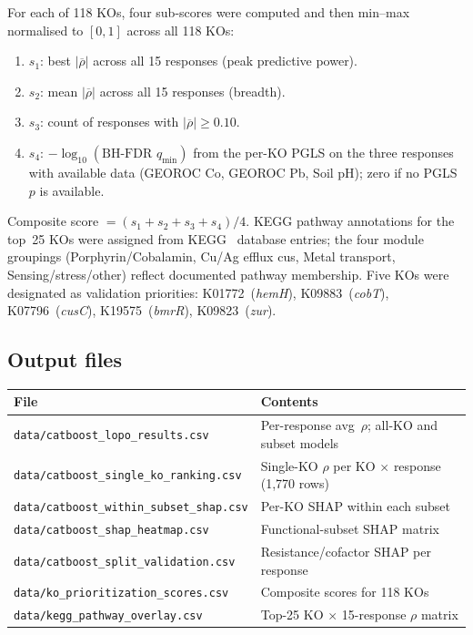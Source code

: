 \documentclass[11pt]{article}
\begin{document}
For each of 118 KOs, four sub-scores were computed and then min--max
normalised to $[0,1]$ across all 118 KOs:
\begin{enumerate}
  \item $s_1$: best $|\overline{\rho}|$ across all 15 responses
        (peak predictive power).
  \item $s_2$: mean $|\overline{\rho}|$ across all 15 responses (breadth).
  \item $s_3$: count of responses with $|\overline{\rho}| \geq 0.10$.
  \item $s_4$: $-\log_{10}(\text{BH-FDR }q_\text{min})$ from the per-KO PGLS
        on the three responses with available data (GEOROC Co, GEOROC Pb,
        Soil pH); zero if no PGLS $p$ is available.
\end{enumerate}
Composite score $= (s_1 + s_2 + s_3 + s_4)/4$.
KEGG pathway annotations for the top~25 KOs were assigned from KEGG~\cite{kanehisa2023} database
entries; the four module groupings (Porphyrin/Cobalamin, Cu/Ag efflux cus,
Metal transport, Sensing/stress/other) reflect documented pathway membership.
Five KOs were designated as validation priorities:
K01772~(\textit{hemH}), K09883~(\textit{cobT}), K07796~(\textit{cusC}),
K19575~(\textit{bmrR}), K09823~(\textit{zur}).

\subsection{Output files}

\begin{center}
\begin{tabular}{ll}
\toprule
File & Contents \\
\midrule
\texttt{data/catboost\_lopo\_results.csv} & Per-response avg~$\rho$; all-KO and subset models \\
\texttt{data/catboost\_single\_ko\_ranking.csv} & Single-KO $\rho$ per KO $\times$ response (1,770 rows) \\
\texttt{data/catboost\_within\_subset\_shap.csv} & Per-KO SHAP within each subset \\
\texttt{data/catboost\_shap\_heatmap.csv} & Functional-subset SHAP matrix \\
\texttt{data/catboost\_split\_validation.csv} & Resistance/cofactor SHAP per response \\
\texttt{data/ko\_prioritization\_scores.csv} & Composite scores for 118 KOs \\
\texttt{data/kegg\_pathway\_overlay.csv} & Top-25 KO $\times$ 15-response $\rho$ matrix \\
\bottomrule
\end{tabular}
\end{center}
\end{document}

